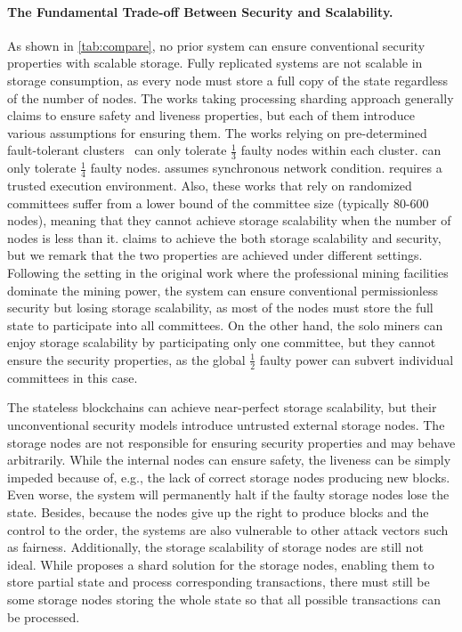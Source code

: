 \paragraph{The Fundamental Trade-off Between Security and Scalability.}
As shown in \autoref{tab:compare}, no prior system can ensure conventional security properties with scalable storage.
Fully replicated systems are not scalable in storage consumption, as every node must store a full copy of the state regardless of the number of nodes.
The works taking processing sharding approach generally claims to ensure safety and liveness properties, but each of them introduce various assumptions for ensuring them.
The works relying on pre-determined fault-tolerant clusters~\cite{ruan2021blockchains,el2019blockchaindb,hong2024gridb,amiri2021sharper,hellings2021byshard} can only tolerate $\frac{1}{3}$ faulty nodes within each cluster.
\cite{kokoris2018omniledger} can only tolerate $\frac{1}{4}$ faulty nodes.
\cite{zamani2018rapidchain} assumes synchronous network condition.
\cite{dang2019towards} requires a trusted execution environment.
Also, these works that rely on randomized committees suffer from a lower bound of the committee size (typically 80-600 nodes), meaning that they cannot achieve storage scalability when the number of nodes is less than it.
\cite{wang2019monoxide} claims to achieve the both storage scalability and security, but we remark that the two properties are achieved under different settings.
Following the setting in the original work where the professional mining facilities dominate the mining power, the system can ensure conventional permissionless security but losing storage scalability, as most of the nodes must store the full state to participate into all committees.
On the other hand, the solo miners can enjoy storage scalability by participating only one committee, but they cannot ensure the security properties, as the global $\frac{1}{2}$ faulty power can subvert individual committees in this case.

The stateless blockchains can achieve near-perfect storage scalability, but their unconventional security models introduce untrusted external storage nodes.
The storage nodes are not responsible for ensuring security properties and may behave arbitrarily.
While the internal nodes  can ensure safety, the liveness can be simply impeded because of, e.g., the lack of correct storage nodes producing new blocks.
Even worse, the system will permanently halt if the faulty storage nodes lose the state.
Besides, because the nodes give up the right to produce blocks and the control to the order, the systems are also vulnerable to other attack vectors such as fairness.
Additionally, the storage scalability of storage nodes are still not ideal.
While \cite{xu2021slimchain} proposes a shard solution for the storage nodes, enabling them to store partial state and process corresponding transactions, there must still be some storage nodes storing the whole state so that all possible transactions can be processed.

